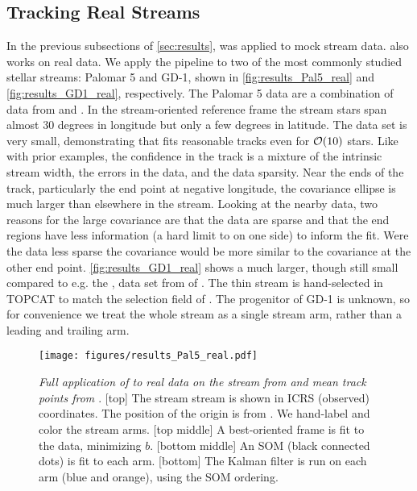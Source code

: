\documentclass[fleqn,usenatbib]{mnras}
\begin{document}

  \subsection{Tracking Real Streams}
  \label{sub:tracking_real_streams}

    In the previous subsections of \autoref{sec:results}, \trackstream{} was
    applied to mock stream data. \trackstream{} also works on real data. We
    apply the pipeline to two of the most commonly studied stellar streams:
    Palomar 5 and GD-1, shown in \autoref{fig:results_Pal5_real} and
    \autoref{fig:results_GD1_real}, respectively. The Palomar 5 data are a
    combination of data from \citet{Ibata2017} and \citet{Starkman2019}. In the
    stream-oriented reference frame the stream stars span almost 30 degrees in
    longitude but only a few degrees in latitude. The data set is very small,
    demonstrating that \trackstream{} fits reasonable tracks even for
    $\mathcal{O}(10)$ stars. Like with prior examples, the confidence in the track
    is a mixture of the intrinsic stream width, the errors in the data, and the
    data sparsity. Near the ends of the track, particularly the end point at
    negative longitude, the covariance ellipse is much larger than elsewhere in
    the stream. Looking at the nearby data, two reasons for the large covariance
    are that the data are sparse and that the end regions have less information
    (a hard limit to on one side) to inform the fit. Were the data less sparse
    the covariance would be more similar to the covariance at the other end
    point. \autoref{fig:results_GD1_real} shows a much larger, though still
    small compared to e.g. the \nbody, data set from \citet{Price-Whelan2018} of
    . The thin stream is hand-selected in TOPCAT \citep{Taylor2005}
    to match the selection field of \citet[][figure 2]{Price-Whelan2018}. The
    progenitor of GD-1 is unknown, so for convenience we treat the whole stream
    as a single stream arm, rather than a leading and trailing arm.

    \begin{figure}
      \centering
      \texttt{[image: figures/results\_Pal5\_real.pdf]}
      \caption{\label{fig:results_Pal5_real}
        \textit{Full application of \trackstream{} to real data on the
         stream from \citet{Ibata2017}
        and mean track points from \citet{Starkman2019}}.
        [top] The stream stream is shown in ICRS (observed) coordinates. The
        position of the origin is from \citet{Vasiliev2019}. We hand-label and
        color the stream arms.
        [top middle] A best-oriented frame is fit to the data, minimizing $b$.
        [bottom middle] An SOM (black connected dots) is fit to each arm. 
        [bottom] The Kalman filter is run on each arm (blue and orange), using
        the SOM ordering.
    }
    \end{figure}
\end{document}
